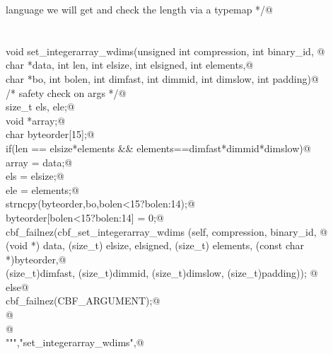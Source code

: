\documentclass[10pt,a4paper,twoside,notitlepage]{article}
\begin{document}
\begin{flushleft}
\begin{list}{}{}
\mbox{}\verb@       language we will get and check the length via a typemap */@\\
\mbox{}\verb@@\\
\mbox{}\verb@%apply (char *STRING, int LENGTH) { (char *data, int len) } set_integerarray_wdims;@\\
\mbox{}\verb@%apply (char *STRING, int LENGTH) { (char *bo, int bolen) } set_integerarray_wdims;@\\
\mbox{}\verb@@\\
\mbox{}\verb@    void set_integerarray_wdims(unsigned int compression, int binary_id, @\\
\mbox{}\verb@             char *data, int len, int elsize, int elsigned, int elements,@\\
\mbox{}\verb@             char *bo, int bolen, int dimfast, int dimmid, int dimslow, int padding){@\\
\mbox{}\verb@        /* safety check on args */@\\
\mbox{}\verb@        size_t els, ele;@\\
\mbox{}\verb@        void *array;@\\
\mbox{}\verb@        char byteorder[15];@\\
\mbox{}\verb@        if(len == elsize*elements && elements==dimfast*dimmid*dimslow){@\\
\mbox{}\verb@           array = data;@\\
\mbox{}\verb@           els = elsize;@\\
\mbox{}\verb@           ele = elements;@\\
\mbox{}\verb@           strncpy(byteorder,bo,bolen<15?bolen:14);@\\
\mbox{}\verb@           byteorder[bolen<15?bolen:14] = 0;@\\
\mbox{}\verb@           cbf_failnez(cbf_set_integerarray_wdims (self, compression, binary_id, @\\
\mbox{}\verb@           (void *) data,  (size_t) elsize, elsigned, (size_t) elements, (const char *)byteorder,@\\
\mbox{}\verb@           (size_t)dimfast, (size_t)dimmid, (size_t)dimslow, (size_t)padding)); @\\
\mbox{}\verb@        }else{@\\
\mbox{}\verb@           cbf_failnez(CBF_ARGUMENT);@\\
\mbox{}\verb@        }@\\
\mbox{}\verb@    }@\\
\mbox{}\verb@""","set_integerarray_wdims",@\\

\end{list}
\end{flushleft}
\end{document}

